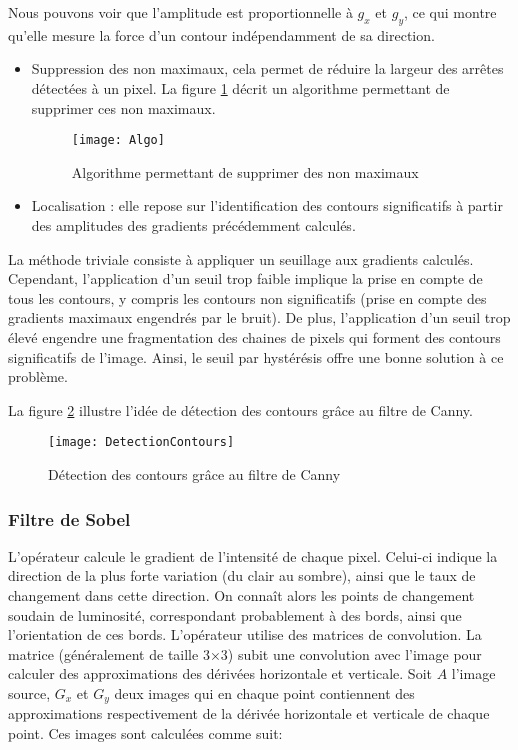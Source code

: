 Nous pouvons voir que l’amplitude est proportionnelle à $g_x$ et $g_y$, ce qui montre qu’elle mesure la force d’un contour indépendamment de sa direction. 
\begin{itemize}[label=\textbullet,font=\color{black}]
\item Suppression des non maximaux, cela permet de réduire la largeur des arrêtes détectées à un pixel. La figure \ref{fig:Algo} décrit un algorithme permettant de supprimer ces non maximaux.
\begin{figure}[h]
  \centering
  \texttt{[image: Algo]}
  \caption{Algorithme permettant de supprimer des non maximaux}
  \label{fig:Algo}
\end{figure}
\item Localisation : elle repose sur l’identification des contours significatifs à partir des amplitudes des gradients précédemment calculés. 
\end{itemize}

La méthode triviale consiste à appliquer un seuillage aux gradients calculés. Cependant, l’application d’un seuil trop faible implique la prise en compte de tous les contours, y compris les contours non significatifs (prise en compte des gradients maximaux engendrés par le bruit). De plus, l’application d’un seuil trop élevé engendre une fragmentation des chaines de pixels qui forment des contours significatifs de l’image. Ainsi, le seuil par hystérésis offre une bonne solution à ce problème. 

La figure \ref{fig:DetectionContours} illustre l’idée de détection des contours grâce au filtre de Canny.
\begin{figure}[H]
  \centering
  \texttt{[image: DetectionContours]}
  \caption{Détection des contours grâce au filtre de Canny}
  \label{fig:DetectionContours}
\end{figure}

\subsubsection*{Filtre de Sobel}

L'opérateur calcule le gradient de l'intensité de chaque pixel. Celui-ci indique la direction de la plus forte variation (du clair au sombre), ainsi que le taux de changement dans cette direction. On connaît alors les points de changement soudain de luminosité, correspondant probablement à des bords, ainsi que l'orientation de ces bords.
L'opérateur utilise des matrices de convolution. La matrice (généralement de taille 3×3) subit une convolution avec l'image pour calculer des approximations des dérivées horizontale et verticale. Soit $A$ l'image source, $G_x$ et $G_y$ deux images qui en chaque point contiennent des approximations respectivement de la dérivée horizontale et verticale de chaque point. Ces images sont calculées comme suit:

